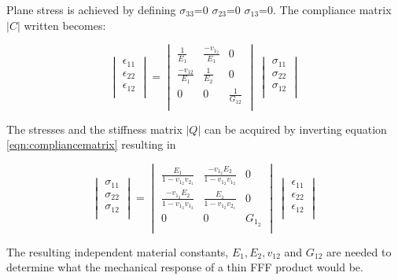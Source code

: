 Plane stress is achieved by defining $\sigma_{33}$=0 $\sigma_{23}$=0 $\sigma_{13}$=0. The compliance matrix $|C|$ written becomes:


\begin{equation}\label{eqn:compliancematrix}
\begin{vmatrix}
\epsilon_{11}\\
\epsilon_{22}\\
\epsilon_{12}\\
\end{vmatrix}
=
\begin{vmatrix}
\frac{1}{E_1} & \frac{-v_1_2}{E_1} & 0\\
\frac{-v_{12}}{E_1} & \frac{1}{E_2} & 0 \\
0 & 0 & \frac{1}{G_{12}}\\
\end{vmatrix}
\
\begin{vmatrix}
\sigma_{11}\\
\sigma_{22}\\
\sigma_{12}\\
\end{vmatrix}
\end{equation}

The stresses and the stiffness matrix $|Q|$ can be acquired by inverting equation \ref{eqn:compliancematrix} resulting in 

\begin{equation}\label{Stiffnesmatrix}
\begin{vmatrix}
\sigma_{11}\\
\sigma_{22}\\
\sigma_{12}\\
\end{vmatrix}
=
\begin{vmatrix}
\frac{E_1}{1-v_1_2v_2_1} & \frac{-v_1_2E_2}{1-v_1_2v_1_2} & 0\\
\frac{-v_1_2E_2}{1-v_1_2v_1_2} & \frac{E_1}{1-v_1_2v_2_1} & 0 \\
0 & 0 & G_1_2\\
\end{vmatrix}
\
\begin{vmatrix}
\epsilon_{11}\\
\epsilon_{22}\\
\epsilon_{12}\\
\end{vmatrix}
\end{equation}

The resulting independent material constants, $E_1, E_2, v_{12}$ and $G_{12}$ are needed to determine what the mechanical response of a thin FFF product would be.


